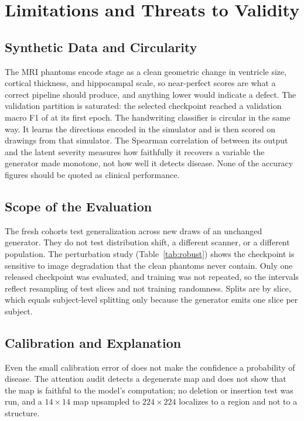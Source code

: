 \documentclass[conference]{IEEEtran}
\begin{document}
\section{Limitations and Threats to Validity}
\label{sec:limits}
\subsection{Synthetic Data and Circularity}
The MRI phantoms encode stage as a clean geometric change in ventricle size, cortical thickness, and hippocampal scale, so near-perfect scores are what a correct pipeline should produce, and anything lower would indicate a defect. The validation partition is saturated: the selected checkpoint reached a validation macro F1 of \CkValScore{} at its first epoch. The handwriting classifier is circular in the same way. It learns the directions encoded in the simulator and is then scored on drawings from that simulator. The Spearman correlation of \HwRho{} between its output and the latent severity measures how faithfully it recovers a variable the generator made monotone, not how well it detects disease. None of the accuracy figures should be quoted as clinical performance.

\subsection{Scope of the Evaluation}
The fresh cohorts test generalization across new draws of an unchanged generator. They do not test distribution shift, a different scanner, or a different population. The perturbation study (Table~\ref{tab:robust}) shows the checkpoint is sensitive to image degradation that the clean phantoms never contain. Only one released checkpoint was evaluated, and training was not repeated, so the intervals reflect resampling of test slices and not training randomness. Splits are by slice, which equals subject-level splitting only because the generator emits one slice per subject.

\subsection{Calibration and Explanation}
Even the small calibration error of \PoolEce{} does not make the confidence a probability of disease. The attention audit detects a degenerate map and does not show that the map is faithful to the model's computation; no deletion or insertion test was run, and a $14\times14$ map upsampled to $224\times224$ localizes to a region and not to a structure.
\end{document}
